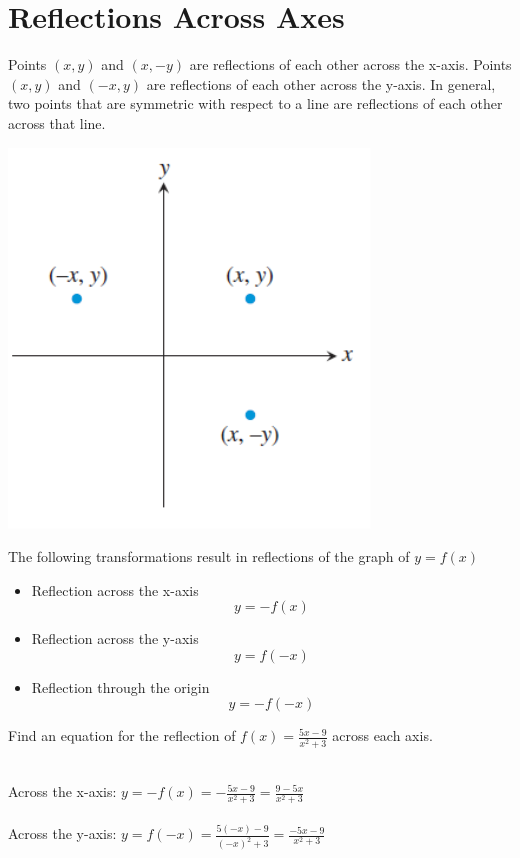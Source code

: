 \documentclass{ximera}
\begin{document}
\section{Reflections Across Axes}
Points $(x,y)$ and $(x,-y)$ are reflections of each other across the x-axis. Points $(x, y)$ and $(-x, y)$ are reflections of each other across the y-axis. In general, two points that are symmetric with respect to a line are reflections of each other across that line.
\begin{image}
\includegraphics[]{images/reflectiongraph}
\end{image}
\begin{callout}
The following transformations result in reflections of the graph of $y = f(x)$
\begin{itemize}
\item Reflection across the x-axis
\[
y=-f(x)
\]
\item Reflection across the y-axis
\[
y=f(-x)
\]
\item Reflection through the origin
\[
y=-f(-x)
\]
\end{itemize}
\end{callout}
\begin{example}
Find an equation for the reflection of $f(x) = \frac{5x - 9}{x^2+3}$ across each axis.
\\
\begin{explanation}\\
Across the x-axis: $y = -f(x) = -\frac{5x-9}{x^2+3}=\frac{9-5x}{x^2+3}$\\
\\
Across the y-axis: $y = f(-x) = \frac{5(-x)-9}{(-x)^2+3}=\frac{-5x-9}{x^2+3}$
\end{explanation}
\end{example}
\end{document}
